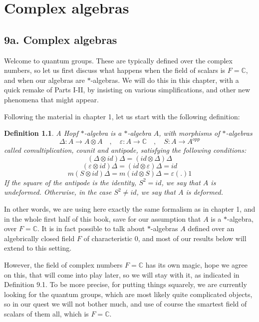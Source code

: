\documentclass[12pt]{amsbook}
\newtheorem{definition}[theorem]{Definition}
\begin{document}
\chapter{Complex algebras}

\section*{9a. Complex algebras}

Welcome to quantum groups. These are typically defined over the complex numbers, so let us first discuss what happens when the field of scalars is $F=\mathbb C$, and when our algebras are $*$-algebras. We will do this in this chapter, with a quick remake of Parts I-II, by insisting on various simplifications, and other new phenomena that might appear. 

\bigskip

Following the material in chapter 1, let us start with the following definition:

\begin{definition}
A Hopf $*$-algebra is a $*$-algebra $A$, with morphisms of $*$-algebras
$$\Delta:A\to A\otimes A\quad,\quad 
\varepsilon:A\to\mathbb C\quad,\quad 
S:A\to A^{opp}$$
called comultiplication, counit and antipode, satisfying the following conditions:
$$(\Delta\otimes id)\Delta=(id\otimes \Delta)\Delta$$
$$(\varepsilon\otimes id)\Delta=(id\otimes\varepsilon)\Delta=id$$
$$m(S\otimes id)\Delta=m(id\otimes S)\Delta=\varepsilon(.)1$$
If the square of the antipode is the identity, $S^2=id$, we say that $A$ is undeformed. Otherwise, in the case $S^2\neq id$, we say that $A$ is deformed.
\end{definition}

In other words, we are using here exactly the same formalism as in chapter 1, and in the whole first half of this book, save for our assumption that $A$ is a $*$-algebra, over $F=\mathbb C$. It is in fact possible to talk about $*$-algebras $A$ defined over an algebrically closed field $F$ of characteristic 0, and most of our results below will extend to this setting. 

\bigskip

However, the field of complex numbers $F=\mathbb C$ has its own magic, hope we agree on this, that will come into play later, so we will stay with it, as indicated in Definition 9.1. To be more precise, for putting things squarely, we are currently looking for the quantum groups, which are most likely quite complicated objects, so in our quest we will not bother much, and use of course the smartest field of scalars of them all, which is $F=\mathbb C$.
\end{document}
